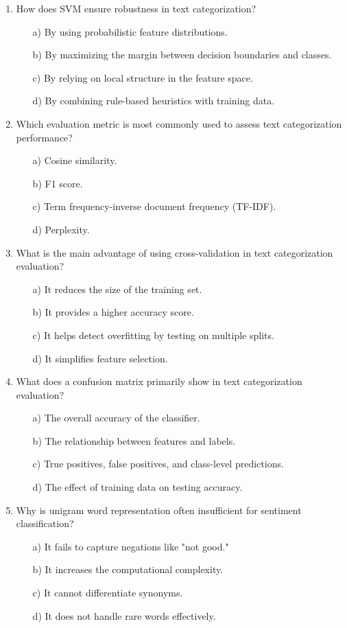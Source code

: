 \documentclass[8pt]{extarticle}
\begin{document}
\begin{multicols}{2}
\begin{enumerate}
\item How does SVM ensure robustness in text categorization?
\begin{itemize}
\item[a)] By using probabilistic feature distributions.
\item[b)] By maximizing the margin between decision boundaries and classes.
\item[c)] By relying on local structure in the feature space.
\item[d)] By combining rule-based heuristics with training data.
\end{itemize}


\item Which evaluation metric is most commonly used to assess text categorization performance?
\begin{itemize}
\item[a)] Cosine similarity.
\item[b)] F1 score.
\item[c)] Term frequency-inverse document frequency (TF-IDF).
\item[d)] Perplexity.
\end{itemize}


\item What is the main advantage of using cross-validation in text categorization evaluation?
\begin{itemize}
\item[a)] It reduces the size of the training set.
\item[b)] It provides a higher accuracy score.
\item[c)] It helps detect overfitting by testing on multiple splits.
\item[d)] It simplifies feature selection.
\end{itemize}


\item What does a confusion matrix primarily show in text categorization evaluation?
\begin{itemize}
\item[a)] The overall accuracy of the classifier.
\item[b)] The relationship between features and labels.
\item[c)] True positives, false positives, and class-level predictions.
\item[d)] The effect of training data on testing accuracy.
\end{itemize}


\item Why is unigram word representation often insufficient for sentiment classification?
\begin{itemize}
\item[a)] It fails to capture negations like "not good."
\item[b)] It increases the computational complexity.
\item[c)] It cannot differentiate synonyms.
\item[d)] It does not handle rare words effectively.
\end{itemize}



\end{enumerate}
\end{multicols}
\end{document}
